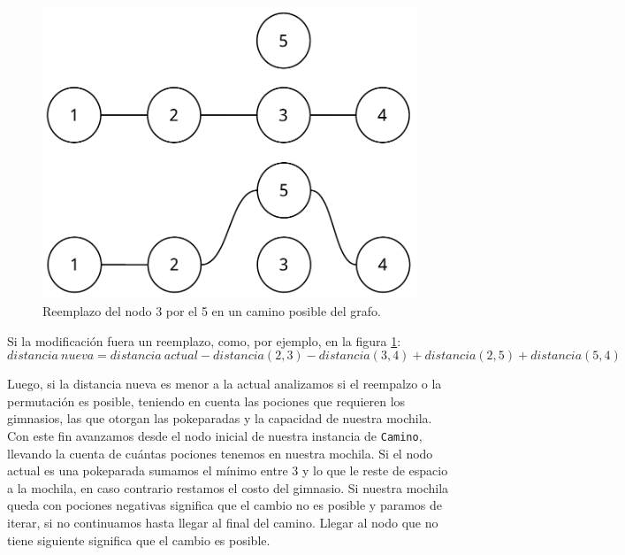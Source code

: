 \begin{figure}[H]
  \begin{center}
    \includegraphics[scale = 0.5]{imagenes/ej3_algoritmo_2.pdf}
    \caption{Reemplazo del nodo 3 por el 5 en un camino posible del grafo.}
    \label{fig:ej3_algoritmo_2}
  \end{center}
\end{figure}

Si la modificaci\'on fuera un reemplazo, como, por ejemplo, en la figura \ref{fig:ej3_algoritmo_2}:
\begin{equation*}
distancia\ nueva = distancia\ actual - distancia(2,3) - distancia(3,4) + distancia(2,5) + distancia(5,4)
\end{equation*}

Luego, si la distancia nueva es menor a la actual analizamos si el reempalzo o la permutaci\'on es posible, teniendo en cuenta las pociones que requieren los gimnasios, las que otorgan las pokeparadas y la capacidad de nuestra mochila. Con este fin avanzamos desde el nodo inicial de nuestra instancia de \texttt{Camino}, llevando la cuenta de cu\'antas pociones tenemos en nuestra mochila. Si el nodo actual es una pokeparada sumamos el m\'inimo entre 3 y lo que le reste de espacio a la mochila, en caso contrario restamos el costo del gimnasio. Si nuestra mochila queda con pociones negativas significa que el cambio no es posible y paramos de iterar, si no continuamos hasta llegar al final del camino. Llegar al nodo que no tiene siguiente significa que el cambio es posible.



